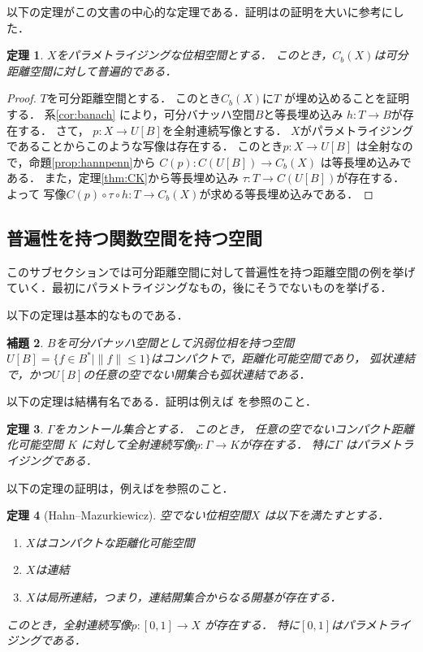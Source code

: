 \documentclass[leqno, a4paper, 12pt]{jsarticle}
\newtheorem{thm}{定理}
\newtheorem{lem}[thm]{補題}
\begin{document}
以下の定理がこの文書の中心的な定理である．証明は\cite[Theorem 3.6]{H2}の証明を大いに参考にした．
\begin{thm}
$X$をパラメトライジングな位相空間とする．
このとき，$C_b(X)$は可分距離空間に対して普遍的である．
\end{thm}
\begin{proof}
$T$を可分距離空間とする．
このとき$C_b(X)$に$T$
が埋め込めることを証明する．
系\ref{cor:banach}
により，可分バナッハ空間$B$と等長埋め込み
$h: T\to B$が存在する．
さて，
$p: X\to U[B]$を全射連続写像とする．
$X$がパラメトライジングであることからこのような写像は存在する．
このとき$p: X\to U[B]$
は全射なので，命題\ref{prop:hannpenn}から
$C(p): C(U[B])\to C_b(X)$
は等長埋め込みである．
また，定理\ref{thm:CK}から等長埋め込み
$\tau: T\to C(U[B])$が存在する．よって
写像$C(p)\circ \tau\circ h: T\to C_b(X)$が求める等長埋め込みである．
\end{proof}

\subsection{普遍性を持つ関数空間を持つ空間}
このサブセクションでは可分距離空間に対して普遍性を持つ距離空間の例を挙げていく．最初にパラメトライジングなもの，後にそうでないものを挙げる．

以下の定理は基本的なものである．
\begin{lem}\label{lem:kabunn}
$B$を可分バナッハ空間として汎弱位相を持つ空間$U[B]=\{f\in B^*\mid \|f\|\le 1\}$はコンパクトで，距離化可能空間であり，
弧状連結で，かつ$U[B]$の任意の空でない開集合も弧状連結である．
\end{lem}

以下の定理は結構有名である．証明は例えば
\cite[Theorem 4.18]{K}を参照のこと．

\begin{thm}
$\Gamma$をカントール集合とする．
このとき，
任意の空でないコンパクト距離化可能空間 $K$
に対して全射連続写像$p: \Gamma\to K$が存在する．
特に$\Gamma$
はパラメトライジングである．
\end{thm}

以下の定理の証明は，例えば\cite{yamyam}を参照のこと．
\begin{thm}[Hahn--Mazurkiewicz]
空でない位相空間$X$
は以下を満たすとする．
\begin{enumerate}
\item $X$はコンパクトな距離化可能空間
\item $X$は連結
\item $X$は局所連結，つまり，連結開集合からなる開基が存在する．
\end{enumerate}
このとき，全射連続写像$p: [0, 1]\to X$
が存在する．
特に$[0, 1]$はパラメトライジングである．
\end{thm}
\end{document}
